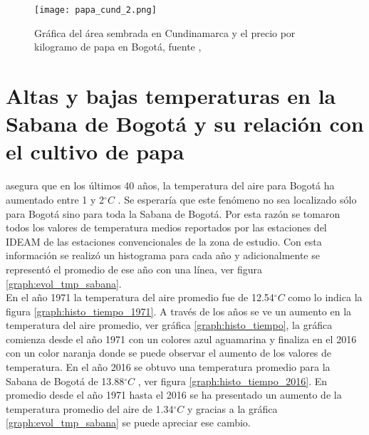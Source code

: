\documentclass[11pt]{article}
\def\celc{$^{\circ}C$ }%
\begin{document}
\begin{figure}[H]
	\begin{center}
	\texttt{[image: papa\_cund\_2.png]}
	\caption{Gráfica del área sembrada en Cundinamarca y el precio por kilogramo de papa en Bogotá, fuente \citep{madr2017, Agronet2018},}
	 \label{gra:papa_precio}
	\end{center}
\end{figure}


\section{Altas y bajas temperaturas en la Sabana de Bogotá y su relación con el cultivo de papa} %
%
\citet{Ruiz2012} asegura que en los últimos 40 años, la temperatura del aire para Bogotá ha aumentado entre 1 y 2\celc. Se esperaría que este fenómeno no sea localizado sólo para Bogotá sino para toda la Sabana de Bogotá. Por esta razón se tomaron todos los valores de temperatura medios reportados por las estaciones del IDEAM de las estaciones convencionales de la zona de estudio. Con esta información se realizó un histograma para cada año y adicionalmente se representó el promedio de ese año con una línea, ver figura \ref{graph:evol_tmp_sabana}.\\

En el año 1971 la temperatura del aire promedio fue de 12.54\celc como lo indica la figura \ref{graph:histo_tiempo_1971}. A través de los años se ve un aumento en la temperatura del aire promedio, ver gráfica \ref{graph:histo_tiempo}, la gráfica comienza desde el año 1971 con un colores azul aguamarina y finaliza en el 2016 con un color naranja donde se puede observar el aumento de los valores de temperatura. En el año 2016 se obtuvo una temperatura promedio para la Sabana de Bogotá de 13.88\celc, ver figura \ref{graph:histo_tiempo_2016}. En promedio desde el año 1971 hasta el 2016 se ha presentado un aumento de la temperatura promedio del aire de 1.34\celc y gracias a la gráfica \ref{graph:evol_tmp_sabana} se puede apreciar ese cambio.


\end{document}
